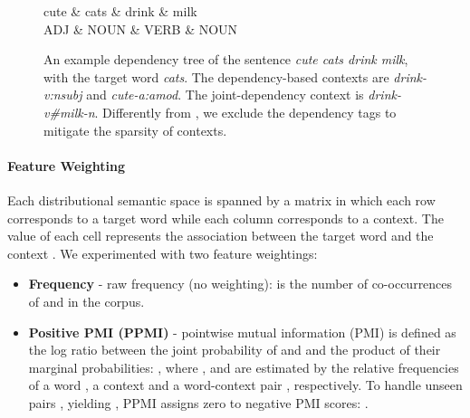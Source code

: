 \documentclass[11pt]{article}
\begin{document}
\begin{figure}[t] 
\centering
\small
\begin{dependency}
\begin{deptext}[column sep=3em]
		cute \& cats \& drink \& milk\\
		\tiny ADJ \& \tiny NOUN \& \tiny VERB \& \tiny NOUN \\
  \end{deptext}
\end{dependency}
\vspace*{-10pt}
\caption{An example dependency tree of the sentence \emph{cute cats drink milk}, with the target word \emph{cats}. 
The dependency-based contexts are \emph{drink-v:nsubj} and \emph{cute-a:amod}. 
The joint-dependency context is \emph{drink-v\#milk-n}. Differently from , we exclude the dependency tags to mitigate the sparsity of contexts.}
\label{fig:dep}
\vspace*{-10pt}
\end{figure}

\paragraph{Feature Weighting} Each distributional semantic space is spanned by a matrix  in which each row corresponds to a target word while each column corresponds to a context. The value of each cell  represents the association between the target word  and the context . We experimented with two feature weightings:

\begin{itemize}[leftmargin=*]
\vspace*{-2pt}
\item \textbf{Frequency} - raw frequency (no weighting):  is the number of co-occurrences of  and  in the corpus.

\vspace*{-2pt}
\item \textbf{Positive PMI (PPMI)} - pointwise mutual information (PMI) \cite{church1990word} is defined as the log ratio between the joint probability of  and  and the product of their marginal probabilities: , where , and  are estimated by the relative frequencies of a word , a context  and a word-context pair , respectively. To handle unseen pairs , yielding , PPMI \cite{bullinaria2007extracting} assigns zero to negative PMI scores: .

\end{itemize}
\end{document}
